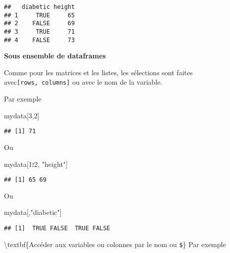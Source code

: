 \documentclass[]{book}
\newenvironment{Shaded}{\begin{snugshade}}{\end{snugshade}}
\newcommand{\DecValTok}[1]{\textcolor[rgb]{0.00,0.00,0.81}{#1}}
\newcommand{\NormalTok}[1]{#1}
\newcommand{\OperatorTok}[1]{\textcolor[rgb]{0.81,0.36,0.00}{\textbf{#1}}}
\newcommand{\StringTok}[1]{\textcolor[rgb]{0.31,0.60,0.02}{#1}}
\begin{document}
\begin{verbatim}
##   diabetic height
## 1     TRUE     65
## 2    FALSE     69
## 3     TRUE     71
## 4    FALSE     73
\end{verbatim}

\textbf{Sous ensemble de dataframes}

Comme pour les matrices et les listes, les sélections sont faites avec\texttt{{[}rows,\ columns{]}} ou avec le nom de la variable.

Par exemple

\begin{Shaded}
\begin{Highlighting}[]
\NormalTok{mydata[}\DecValTok{3}\NormalTok{,}\DecValTok{2}\NormalTok{]}
\end{Highlighting}
\end{Shaded}

\begin{verbatim}
## [1] 71
\end{verbatim}

Ou

\begin{Shaded}
\begin{Highlighting}[]
\NormalTok{mydata[}\DecValTok{1}\OperatorTok{:}\DecValTok{2}\NormalTok{, }\StringTok{"height"}\NormalTok{]}
\end{Highlighting}
\end{Shaded}

\begin{verbatim}
## [1] 65 69
\end{verbatim}

Ou

\begin{Shaded}
\begin{Highlighting}[]
\NormalTok{mydata[,}\StringTok{"diabetic"}\NormalTok{]}
\end{Highlighting}
\end{Shaded}

\begin{verbatim}
## [1]  TRUE FALSE  TRUE FALSE
\end{verbatim}

\textbackslash textbf\{Accéder aux variables ou colonnes par le nom ou \texttt{\$}\}
Par exemple

\begin{Shaded}
\end{Shaded}
\end{document}
